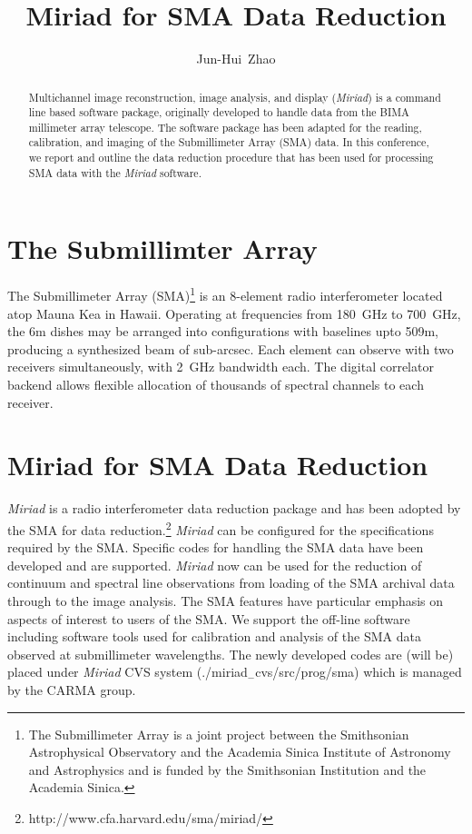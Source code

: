 
\resetcounters




\title{Miriad for SMA Data Reduction}
\author{Jun-Hui~Zhao
}


\begin{abstract}
Multichannel image reconstruction, image analysis, and display ({\it Miriad}) 
is a command line based software package, originally developed to handle 
data from the BIMA millimeter array telescope. The software package has been 
adapted for the reading, calibration, and imaging of the Submillimeter Array
(SMA)  data. In this conference, we report and outline the data reduction
procedure that has been used for processing SMA data with the {\it Miriad} 
software. 	 
\end{abstract}

\section{The Submillimter Array}
The Submillimeter Array (SMA)\footnote{The Submillimeter Array is a joint 
project between the Smithsonian
Astrophysical Observatory and the Academia Sinica Institute of Astronomy
and Astrophysics and is funded by the Smithsonian Institution and the
Academia Sinica.} is an 8-element radio interferometer located atop Mauna Kea 
in Hawaii. Operating at frequencies from 180~GHz to 700~GHz, the 6m dishes 
may be arranged into configurations with baselines upto 509m, producing a 
synthesized beam of sub-arcsec. Each element can observe with two receivers 
simultaneously, with 2~GHz bandwidth each. The digital correlator backend 
allows flexible allocation of thousands of spectral channels to each receiver.

\section{Miriad for SMA Data Reduction}
{\it Miriad} is a radio interferometer data reduction package \citep{stw95} 
and has been adopted by the SMA for data reduction.\footnote{http://www.cfa.harvard.edu/sma/miriad/} {\it Miriad} can be configured 
for the specifications required by the SMA. Specific codes for handling 
the SMA data have been developed and are supported. {\it Miriad} now can be 
used for the reduction of continuum and spectral line observations from 
loading of the SMA archival data  through to the image analysis. The SMA 
features have particular emphasis on aspects of interest to users of the 
SMA. We support the off-line software including software tools used for 
calibration and analysis of the SMA data observed at submillimeter 
wavelengths. The newly developed codes are (will be) placed under 
{\it Miriad} CVS system (./miriad$_{-}$cvs/src/prog/sma) 
which is managed by the CARMA group.


